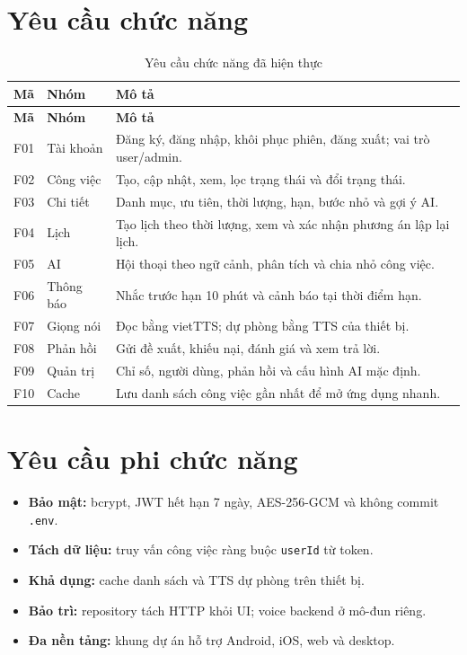 \documentclass[12pt,a4paper,oneside]{report}
\begin{document}
\section{Yêu cầu chức năng}
\begin{longtable}{p{1.1cm}p{4.3cm}p{9.4cm}}
\caption{Yêu cầu chức năng đã hiện thực}\label{tab:functions}\\
\toprule\textbf{Mã}&\textbf{Nhóm}&\textbf{Mô tả}\\\midrule\endfirsthead
\toprule\textbf{Mã}&\textbf{Nhóm}&\textbf{Mô tả}\\\midrule\endhead
F01&Tài khoản&Đăng ký, đăng nhập, khôi phục phiên, đăng xuất; vai trò user/admin.\\
F02&Công việc&Tạo, cập nhật, xem, lọc trạng thái và đổi trạng thái.\\
F03&Chi tiết&Danh mục, ưu tiên, thời lượng, hạn, bước nhỏ và gợi ý AI.\\
F04&Lịch&Tạo lịch theo thời lượng, xem và xác nhận phương án lập lại lịch.\\
F05&AI&Hội thoại theo ngữ cảnh, phân tích và chia nhỏ công việc.\\
F06&Thông báo&Nhắc trước hạn 10 phút và cảnh báo tại thời điểm hạn.\\
F07&Giọng nói&Đọc bằng vietTTS; dự phòng bằng TTS của thiết bị.\\
F08&Phản hồi&Gửi đề xuất, khiếu nại, đánh giá và xem trả lời.\\
F09&Quản trị&Chỉ số, người dùng, phản hồi và cấu hình AI mặc định.\\
F10&Cache&Lưu danh sách công việc gần nhất để mở ứng dụng nhanh.\\\bottomrule
\end{longtable}

\section{Yêu cầu phi chức năng}
\begin{itemize}
 \item \textbf{Bảo mật:} bcrypt, JWT hết hạn 7 ngày, AES-256-GCM và không commit \texttt{.env}.
 \item \textbf{Tách dữ liệu:} truy vấn công việc ràng buộc \texttt{userId} từ token.
 \item \textbf{Khả dụng:} cache danh sách và TTS dự phòng trên thiết bị.
 \item \textbf{Bảo trì:} repository tách HTTP khỏi UI; voice backend ở mô-đun riêng.
 \item \textbf{Đa nền tảng:} khung dự án hỗ trợ Android, iOS, web và desktop.
\end{itemize}
\end{document}
